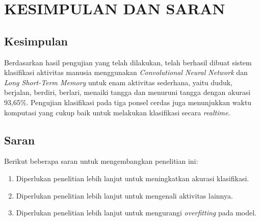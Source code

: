 \chapter{KESIMPULAN DAN SARAN}

\section{Kesimpulan}
Berdasarkan hasil pengujian yang telah dilakukan, telah berhasil dibuat sistem klasifikasi aktivitas manusia menggunakan \textit{Convolutional Neural Network} dan \textit{Long Short-Term Memory} untuk enam aktivitas sederhana, yaitu duduk, berjalan, berdiri, berlari, menaiki tangga dan menuruni tangga dengan akurasi 93,65\%. Pengujian klasifikasi pada tiga ponsel cerdas juga menunjukkan waktu komputasi yang cukup baik untuk melakukan klasifikasi secara \textit{realtime}.

\section{Saran}
Berikut beberapa saran untuk mengembangkan penelitian ini:

\begin{enumerate}
    \item Diperlukan penelitian lebih lanjut untuk meningkatkan akurasi klasifikasi.
    \item Diperlukan penelitian lebih lanjut untuk mengenali aktivitas lainnya.
    \item Diperlukan penelitian lebih lanjut untuk mengurangi \textit{overfitting} pada model.
\end{enumerate}
